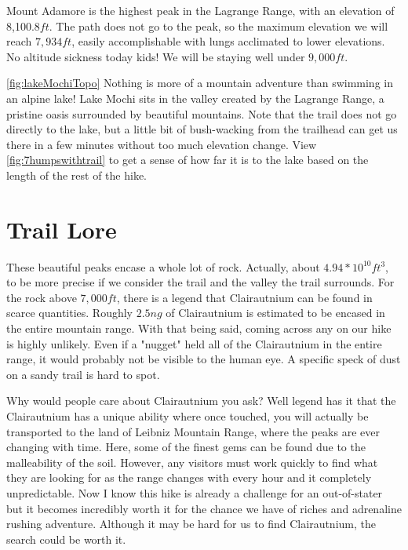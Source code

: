 \documentclass[12pt]{article}   %
\theoremstyle{definition}
\numberwithin{equation}{section}
\begin{document}
\quad Mount Adamore is the highest peak in the Lagrange Range, with an elevation of 8,100.8$ft$. The path does not go to the peak, so the maximum elevation we will reach $7,934ft$, easily accomplishable with lungs acclimated to lower elevations. No altitude sickness today kids! We will be staying well under $9,000ft$.





\quad \autoref{fig:lakeMochiTopo} Nothing is more of a mountain adventure than swimming in an alpine lake! Lake Mochi sits in the valley created by the Lagrange Range, a pristine oasis surrounded by beautiful mountains. Note that the trail does not go directly to the lake, but a little bit of bush-wacking from the trailhead can get us there in a few minutes without too much elevation change. View \autoref{fig:7humpswithtrail} to get a sense of how far it is to the lake based on the length of the rest of the hike.
\section{Trail Lore} \label{APPM2350proj02sec05}

\quad These beautiful peaks encase a whole lot of rock. Actually, about $4.94*10^{10}ft^3$, to be more precise if we consider the trail and the valley the trail surrounds. For the rock above $7,000ft$, there is a legend that Clairautnium can be found in scarce quantities. Roughly $2.5ng$ of Clairautnium is estimated to be encased in the entire mountain range. With that being said, coming across any on our hike is highly unlikely. Even if a "nugget" held all of the Clairautnium in the entire range, it would probably not be visible to the human eye. A specific speck of dust on a sandy trail is hard to spot.

\quad Why would people care about Clairautnium you ask? Well legend has it that the Clairautnium has a unique ability where once touched, you will actually be transported to the land of Leibniz Mountain Range, where the peaks are ever changing with time. Here, some of the finest gems can be found due to the malleability of the soil. However, any visitors must work quickly to find what they are looking for as the range changes with every hour and it completely unpredictable. Now I know this hike is already a challenge for an out-of-stater but it becomes incredibly worth it for the chance we have of riches and adrenaline rushing adventure. Although it may be hard for us to find Clairautnium, the search could be worth it.
\end{document}
